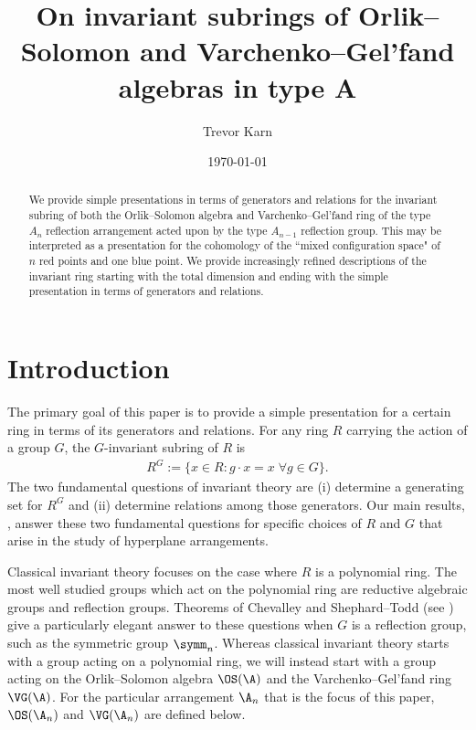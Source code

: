 \documentclass{amsart}
\title{On invariant subrings of Orlik--Solomon and Varchenko--Gel'fand algebras in type A}
\author{Trevor Karn}
\date{\today}
\begin{document}
\maketitle

\begin{abstract}
    We provide simple presentations in terms of generators and relations for the invariant subring of both the Orlik--Solomon algebra and Varchenko--Gel'fand ring of the type $A_n$ reflection arrangement acted upon by the type $A_{n-1}$ reflection group. 
    This may be interpreted as a presentation for the cohomology of the ``mixed configuration space" of $n$ red points and one blue point.
    We provide increasingly refined descriptions of the invariant ring starting with the total dimension and ending with the simple presentation in terms of generators and relations.
\end{abstract}

\tableofcontents


\section{Introduction}

The primary goal of this paper is to provide a simple presentation for a certain ring in terms of its generators and relations.
For any ring $R$ carrying the action of a group $G$, the $G$-invariant subring of $R$ is
\begin{align*}
R^G := \{x \in R : g \cdot x = x \; \forall g \in G\}.
\end{align*}
The two fundamental questions of invariant theory are (i) determine a generating set for $R^G$ and (ii) determine relations among those generators.
Our main results, , answer these two fundamental questions for specific choices of $R$ and $G$ that arise in the study of hyperplane arrangements.

Classical invariant theory focuses on the case where $R$ is a polynomial ring.
The most well studied groups which act on the polynomial ring are reductive algebraic groups and reflection groups.
Theorems of Chevalley and Shephard--Todd (see \cite[Chapter~3]{humphreys}) give a particularly elegant answer to these questions when $G$ is a reflection group, such as the symmetric group $\symm_n$.
Whereas classical invariant theory starts with a group acting on a polynomial ring, we will instead start with a group acting on the Orlik--Solomon algebra $\OS(\A)$ and the Varchenko--Gel'fand ring $\VG(\A)$.
For the particular arrangement $\A_n$ that is the focus of this paper, $\OS(\A_n)$ and $\VG(\A_n)$ are defined below.
\end{document}
